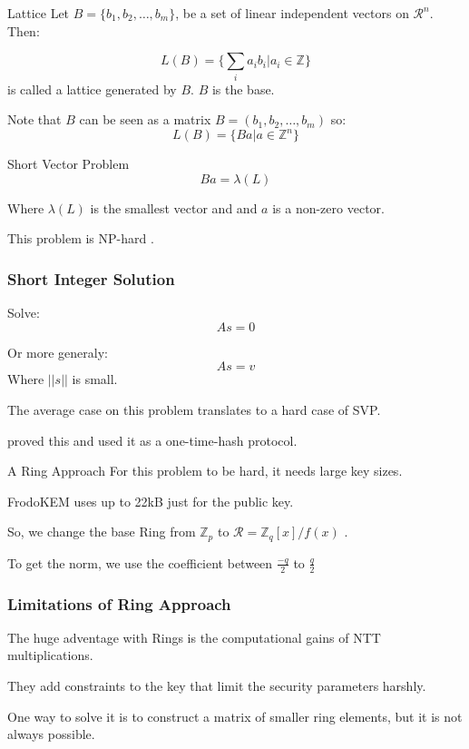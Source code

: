 \documentclass[presentation]{beamer}
\begin{document}
\begin{frame}[label=lattice]{Lattice}
  Let \(B = \{b_1, b_2, \dots, b_m\}\), be a set of linear
  independent
  vectors on \(\mathcal R ^ n\). Then:

  \[
    L(B) = \{\sum_i a_i b_i | a_i \in \mathbb Z \}
  \]
  is called a lattice generated by \(B\). \(B\) is the base.

  Note that \(B\) can be seen as a matrix \(B = (b_1, b_2,
  \dots, b_m)\)
  so:
  \[
    L(B) = \{Ba | a \in \mathbb Z^{n} \}
  \]
\end{frame}
\begin{frame}[label=short-vector-problem]{Short Vector Problem}
  \[
    Ba = \lambda(L)
  \]

  Where \(\lambda (L)\) is the smallest vector and and \(a\)
  is a non-zero
  vector.

  This problem is NP-hard \cite{original-ajtai}.
\end{frame}
\begin{frame}[label=short-integer-solution]
  \frametitle{Short Integer Solution}
  Solve:
  \[
    As = 0
  \]

  Or more generaly:
  \[
    As = v
  \]
  Where \(||s||\) is small.

  The average case on this problem translates to a hard case
  of SVP.

  \cite{original-ajtai} proved this and used it as a one-time-hash protocol.
\end{frame}
\begin{frame}[label=a-ring-approach]{A Ring Approach}
  For this problem to be hard, it needs large key sizes.

  FrodoKEM \cite{FrodoKEM} uses up to 22kB just for the public key.

  So, we change the base Ring from \(\mathbb Z_p\) to
  \(\mathcal R = \mathbb Z_q[x] / f(x)\) \cite{ring-sis, ring-lwe-1,ring-lwe-2}.
  \pause

  To get the norm, we use the coefficient between 
  $\frac{-q}{2}$ to $\frac{q}{2}$
\end{frame}
\begin{frame}[label=limitations-of-ring-approach]
  \frametitle{Limitations of Ring Approach}
  The huge adventage with Rings is the computational gains of NTT
  multiplications.

  They add constraints to the key that limit the security
  parameters harshly.

  One way to solve it is to construct a matrix of smaller ring
  elements, but it is not always possible.

\end{frame}
\end{document}
